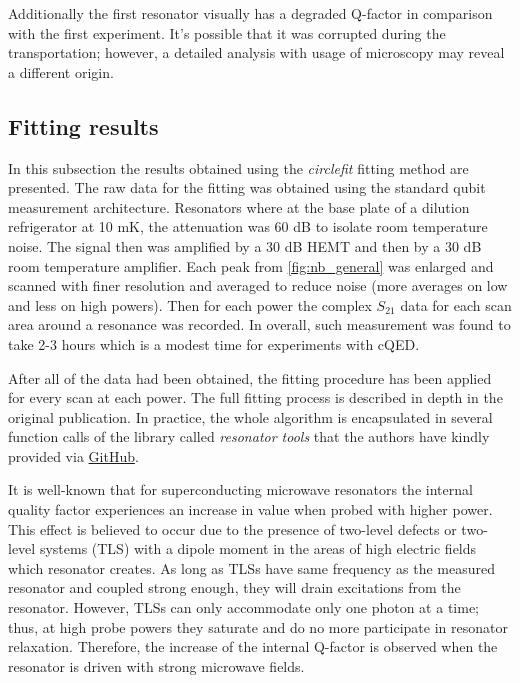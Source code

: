 \documentclass[12pt]{article}
\numberwithin{equation}{section}
\numberwithin{figure}{section}
\begin{document}
Additionally the first resonator visually has a degraded Q-factor in comparison with the first experiment. It's possible that it was corrupted during the transportation; however, a detailed analysis with usage of microscopy may reveal a different origin.

\subsection{Fitting results}

In this subsection the results obtained using the \textit{circlefit} fitting method are presented.
The raw data for the fitting was obtained using the standard qubit measurement architecture. Resonators where at the base plate of a dilution refrigerator at 10 mK, the attenuation was 60 dB to isolate room temperature noise. The signal then was amplified by a 30 dB HEMT and then by a 30 dB room temperature amplifier. Each peak from \autoref{fig:nb_general} was enlarged and scanned with finer resolution and averaged to reduce noise (more averages on low and less on high powers). Then for each power the complex $S_{21}$ data for each scan area around a resonance was recorded. In overall, such measurement was found to take 2-3 hours which is a modest time for experiments with cQED.

After all of the data had been obtained, the fitting procedure has been applied for every scan at each power. The full fitting process is described in depth in the original publication\cite{probst2015}. In practice, the whole algorithm is encapsulated in several function calls of the library called \textit{resonator tools} that the authors have kindly provided via \href{https://github.com/sebastianprobst/resonatortools}{GitHub}.

It is well-known\cite{wang2009} that for superconducting microwave resonators the internal quality factor experiences an increase in value when probed with higher power. This effect is believed to occur due to the presence of two-level defects or two-level systems (TLS) with a dipole moment in the areas of high electric fields which resonator creates. As long as TLSs have same frequency as the measured resonator and coupled strong enough, they will drain excitations from the resonator. However, TLSs can only accommodate only one photon at a time; thus, at high probe powers they saturate and do no more participate in resonator relaxation. Therefore, the increase of the internal Q-factor is observed when the resonator is driven with strong microwave fields.
\end{document}
